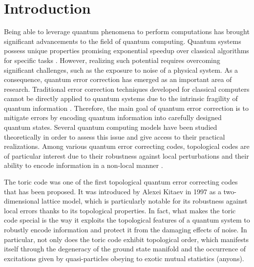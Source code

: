 \documentclass{Configuration_Files/PoliMi3i_thesis}
\begin{document}
\mainmatter %








\chapter*{Introduction}

Being able to leverage quantum phenomena to perform computations has brought significant 
advancements to the field of quantum computing. Quantum systems possess unique properties promising exponential speedup over classical algorithms for specific tasks \cite{Nie06}. However, realizing such potential 
requires overcoming significant challenges, such as the exposure to
noise of a physical system. As a consequence, quantum error correction has emerged as an important area of research. Traditional error correction techniques developed for classical computers cannot be directly applied to quantum systems due to the intrinsic fragility of quantum information \cite{Cha06}. Therefore, the main goal of quantum error correction is to mitigate errors by encoding quantum information into carefully designed quantum states. Several quantum computing models have been studied theoretically
in order to assess this issue and give access to their practical realizations. 
Among various quantum error correcting codes, topological codes are of particular interest due to their robustness against local perturbations and their ability to encode information in a non-local manner \cite{Kit02}. \newline

The toric code was one of the first topological quantum error correcting codes that has been proposed. It was introduced by Alexei Kitaev in 1997 as a two-dimensional lattice model, which is particularly notable for its robustness against local errors thanks to its topological properties. In fact, what makes the toric code special is the way it exploits the topological features of a quantum system to robustly encode information and protect it from the damaging effects of noise. In particular, not only does the toric code exhibit topological order, which manifests itself through the degeneracy of the ground state manifold and the occurrence of excitations given by quasi-particles obeying to exotic mutual statistics (anyons).\newline
\end{document}
